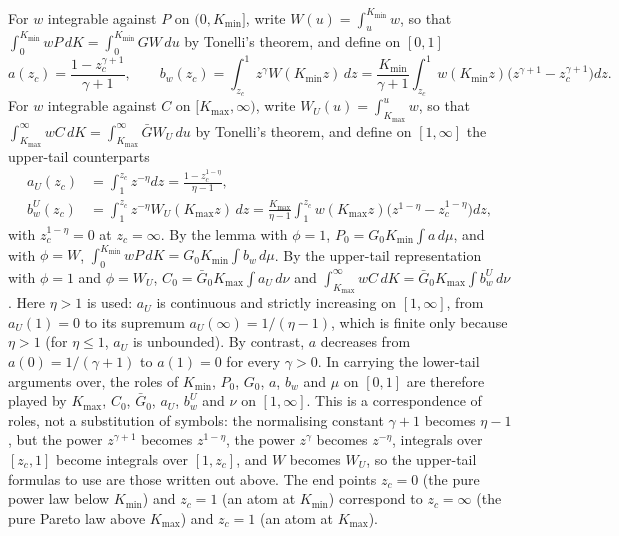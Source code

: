 \documentclass[11pt]{article}
\theoremstyle{remark}
\begin{document}
For $w$ integrable against $P$ on $(0,K_{\min}]$, write $W(u)=\int_u^{K_{\min}}w$, so that $\int_0^{K_{\min}}wP\,dK=\int_0^{K_{\min}}GW\,du$ by Tonelli's theorem, and define on $[0,1]$
\[
a(z_c)=\frac{1-z_c^{\gamma+1}}{\gamma+1},\qquad b_w(z_c)=\int_{z_c}^1z^\gamma W(K_{\min}z)\,dz=\frac{K_{\min}}{\gamma+1}\int_{z_c}^1w(K_{\min}z)\bigl(z^{\gamma+1}-z_c^{\gamma+1}\bigr)dz.
\]
For $w$ integrable against $C$ on $[K_{\max},\infty)$, write $W_U(u)=\int_{K_{\max}}^uw$, so that $\int_{K_{\max}}^\infty wC\,dK=\int_{K_{\max}}^\infty\bar GW_U\,du$ by Tonelli's theorem, and define on $[1,\infty]$ the upper-tail counterparts
\begin{align*}
a_U(z_c)&=\int_1^{z_c}z^{-\eta}dz=\frac{1-z_c^{1-\eta}}{\eta-1},\\
b^U_w(z_c)&=\int_1^{z_c}z^{-\eta}W_U(K_{\max}z)\,dz=\frac{K_{\max}}{\eta-1}\int_1^{z_c}w(K_{\max}z)\bigl(z^{1-\eta}-z_c^{1-\eta}\bigr)dz,
\end{align*}
with $z_c^{1-\eta}=0$ at $z_c=\infty$. By the lemma with $\phi=1$, $P_0=G_0K_{\min}\int a\,d\mu$, and with $\phi=W$, $\int_0^{K_{\min}}wP\,dK=G_0K_{\min}\int b_w\,d\mu$. By the upper-tail representation with $\phi=1$ and $\phi=W_U$, $C_0=\bar G_0K_{\max}\int a_U\,d\nu$ and $\int_{K_{\max}}^\infty wC\,dK=\bar G_0K_{\max}\int b^U_w\,d\nu$. Here $\eta>1$ is used: $a_U$ is continuous and strictly increasing on $[1,\infty]$, from $a_U(1)=0$ to its supremum $a_U(\infty)=1/(\eta-1)$, which is finite only because $\eta>1$ (for $\eta\le1$, $a_U$ is unbounded). By contrast, $a$ decreases from $a(0)=1/(\gamma+1)$ to $a(1)=0$ for every $\gamma>0$. In carrying the lower-tail arguments over, the roles of $K_{\min}$, $P_0$, $G_0$, $a$, $b_w$ and $\mu$ on $[0,1]$ are therefore played by $K_{\max}$, $C_0$, $\bar G_0$, $a_U$, $b^U_w$ and $\nu$ on $[1,\infty]$. This is a correspondence of roles, not a substitution of symbols: the normalising constant $\gamma+1$ becomes $\eta-1$, but the power $z^{\gamma+1}$ becomes $z^{1-\eta}$, the power $z^\gamma$ becomes $z^{-\eta}$, integrals over $[z_c,1]$ become integrals over $[1,z_c]$, and $W$ becomes $W_U$, so the upper-tail formulas to use are those written out above. The end points $z_c=0$ (the pure power law below $K_{\min}$) and $z_c=1$ (an atom at $K_{\min}$) correspond to $z_c=\infty$ (the pure Pareto law above $K_{\max}$) and $z_c=1$ (an atom at $K_{\max}$).
\end{document}

